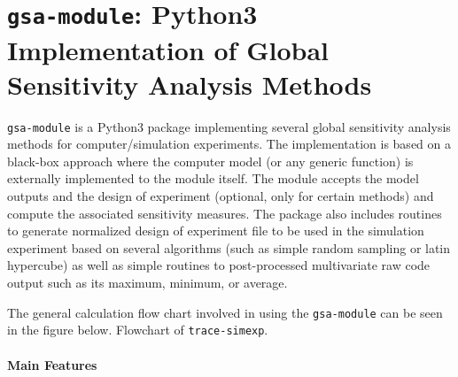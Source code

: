 \section[\texttt{gsa-module}]{\texttt{gsa-module}: Python3 Implementation of Global Sensitivity Analysis Methods}\label{app:gsa_module}

\texttt{gsa-module} is a Python3 package implementing several global sensitivity analysis methods for computer/simulation experiments.
The implementation is based on a black-box approach where the computer model (or any generic function) is externally implemented to the module itself.
The module accepts the model outputs and the design of experiment (optional, only for certain methods) and compute the associated sensitivity measures.
The package also includes routines to generate normalized design of experiment file to be used in the simulation experiment based on several algorithms (such as simple random sampling or latin hypercube) as well as simple routines to post-processed multivariate raw code output such as its maximum, minimum, or average.

The general calculation flow chart involved in using the \texttt{gsa-module} can be seen in the figure below.
{Flowchart of \texttt{trace-simexp}.}

\paragraph{Main Features}


